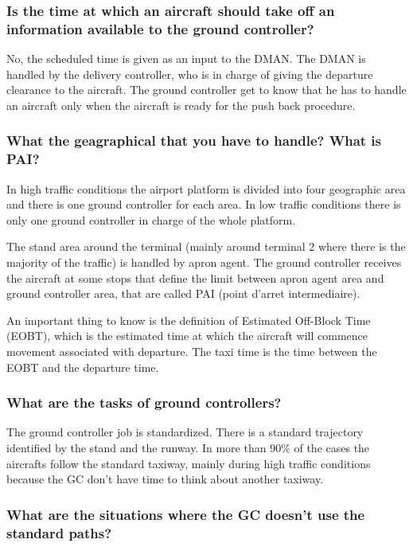 \documentclass{article}
\begin{document}
\newpage

\subsubsection*{Is the time at which an aircraft should take off an information available to the ground controller?}


No, the scheduled time is given as an input to the DMAN. The DMAN is handled by the delivery controller, who is in charge of giving the departure clearance to the aircraft.
The ground controller get to know that he has to handle an aircraft only when the aircraft is ready for the push back procedure.

\subsubsection*{What the geagraphical that you have to handle? What is PAI?}

In high traffic conditions the airport platform is divided into four geographic area and there is one ground controller for each area.
In low traffic conditions there is only one ground controller in charge of the whole platform.

The stand area around the terminal (mainly around terminal 2 where there is the majority of the traffic) is handled by apron agent.
The ground controller receives the aircraft at some stops that define the limit between apron agent area and ground controller area, that are called PAI (point d'arret intermediaire).

An important thing to know is the definition of Estimated Off-Block Time (EOBT), which is the estimated time at which the aircraft will commence movement associated with departure.
The taxi time is the time between the EOBT and the departure time.


\subsubsection*{What are the tasks of ground controllers?}


The ground controller job is standardized. There is a standard trajectory identified by the stand and the runway. In more than 90\% of the cases the aircrafts follow the standard taxiway, mainly during high traffic conditions because the GC don't have time to think about another taxiway.

\subsubsection*{What are the situations where the GC doesn't use the standard paths?}
\end{document}
